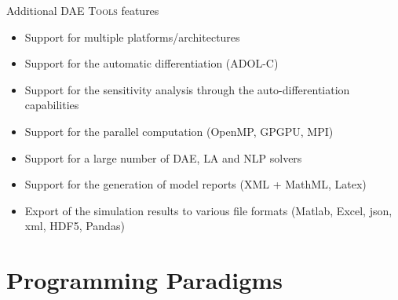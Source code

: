 \documentclass[compress,newPxFont,sthlmFooter]{beamer}
\begin{document}

\begin{frame}{Additional \textsc{DAE Tools} features}
    \begin{itemize}
        \item Support for \alert{multiple platforms/architectures} 
        \item Support for the \alert{automatic differentiation} (ADOL-C)
        \item Support for the \alert{sensitivity analysis} through the auto-differentiation capabilities
        \item Support for the \alert{parallel} computation (OpenMP, GPGPU, MPI)
        \item Support for a large number of \alert{DAE}, \alert{LA} and \alert{NLP} solvers 
        \item Support for the generation of \alert{model reports} (XML + MathML, Latex)
        \item \alert{Export} of the \alert{simulation results} to various file formats (Matlab, Excel, json, xml, HDF5, Pandas)
    \end{itemize}
\end{frame}

\section{Programming Paradigms}
\end{document}
